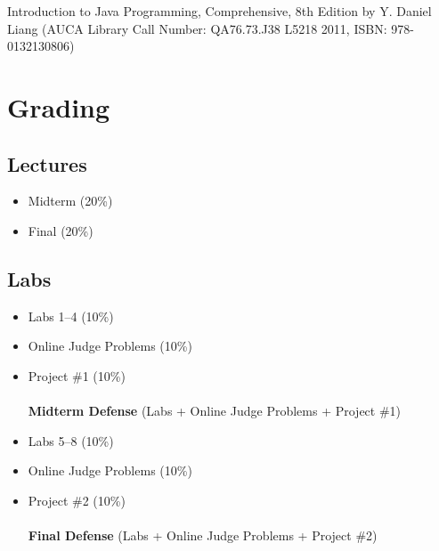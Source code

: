 \documentclass[12pt,a4paper,oneside]{article}
\begin{document}
        Introduction to Java Programming, Comprehensive, 8th Edition by Y.
        Daniel Liang (AUCA Library Call Number: QA76.73.J38 L5218 2011, ISBN:
        978-0132130806)

    \section{Grading}

        \subsection{Lectures}

            \begin{itemize}
                \item Midterm (20\%)
                \item Final (20\%)
            \end{itemize}

        \subsection{Labs}

            \begin{itemize}
                \item Labs 1--4 (10\%)
                \item Online Judge Problems (10\%)
                \item Project \#1 (10\%)\\\\
                    \textbf{Midterm Defense} (Labs + Online Judge Problems + Project \#1)\\
                \item Labs 5--8 (10\%)
                \item Online Judge Problems (10\%)
                \item Project \#2 (10\%)\\\\
                    \textbf{Final Defense} (Labs + Online Judge Problems + Project \#2)\\
            \end{itemize}
\end{document}
